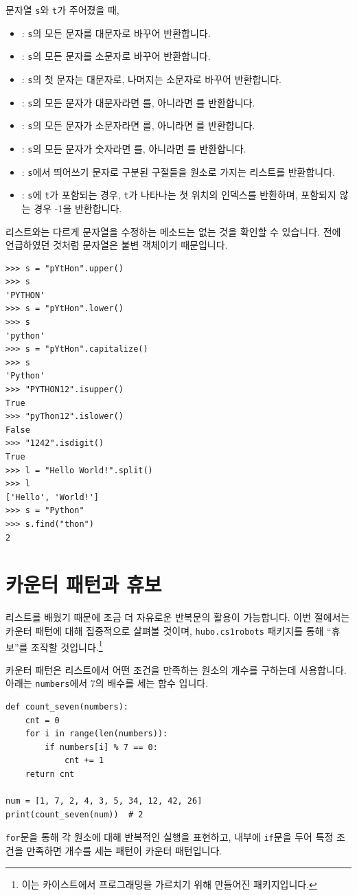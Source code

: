 \documentclass[../main.tex]{subfiles}
\begin{document}
문자열 \texttt{s}와 \texttt{t}가 주어졌을 때,
\begin{itemize}
\item {}: \texttt{s}의 모든 문자를 대문자로 바꾸어 반환합니다.
\item {}: \texttt{s}의 모든 문자를 소문자로 바꾸어 반환합니다.
\item {}: \texttt{s}의 첫 문자는 대문자로, 나머지는 소문자로 바꾸어 반환합니다.
\item {}: \texttt{s}의 모든 문자가 대문자라면 를, 아니라면 를 반환합니다.
\item {}: \texttt{s}의 모든 문자가 소문자라면 를, 아니라면 를 반환합니다.
\item {}: \texttt{s}의 모든 문자가 숫자라면 를, 아니라면 를 반환합니다.
\item {}: \texttt{s}에서 띄어쓰기 문자로 구분된 구절들을 원소로 가지는 리스트를 반환합니다.
\item {}: \texttt{s}에 \texttt{t}가 포함되는 경우, \texttt{t}가 나타나는 첫 위치의 인덱스를 반환하며, 포함되지 않는 경우 -1을 반환합니다.
\end{itemize}

리스트와는 다르게 문자열을 수정하는 메소드는 없는 것을 확인할 수 있습니다.
전에 언급하였던 것처럼 문자열은 불변 객체이기 때문입니다.
\begin{verbatim}
>>> s = "pYtHon".upper()
>>> s
'PYTHON'
>>> s = "pYtHon".lower()
>>> s
'python'
>>> s = "pYtHon".capitalize()
>>> s
'Python'
>>> "PYTHON12".isupper()
True
>>> "pyThon12".islower()
False
>>> "1242".isdigit()
True
>>> l = "Hello World!".split()
>>> l
['Hello', 'World!']
>>> s = "Python"
>>> s.find("thon")
2
\end{verbatim}

\section{카운터 패턴과 휴보}
리스트를 배웠기 때문에 조금 더 자유로운 반복문의 활용이 가능합니다.
이번 절에서는 카운터 패턴에 대해 집중적으로 살펴볼 것이며, \texttt{hubo.cs1robots} 패키지를 통해 ``휴보''를 조작할 것입니다.\footnote{이는 카이스트에서 프로그래밍을 가르치기 위해 만들어진 패키지입니다.}

카운터 패턴은 리스트에서 어떤 조건을 만족하는 원소의 개수를 구하는데 사용합니다.
아래는 \texttt{numbers}에서 7의 배수를 세는 함수 입니다.
\begin{verbatim}
def count_seven(numbers):
    cnt = 0
    for i in range(len(numbers)):
        if numbers[i] % 7 == 0:
            cnt += 1
    return cnt

num = [1, 7, 2, 4, 3, 5, 34, 12, 42, 26]
print(count_seven(num))  # 2
\end{verbatim}
\texttt{for}문을 통해 각 원소에 대해 반복적인 실행을 표현하고, 내부에 \texttt{if}문을 두어 특정 조건을 만족하면 개수를 세는 패턴이 카운터 패턴입니다.
\end{document}
